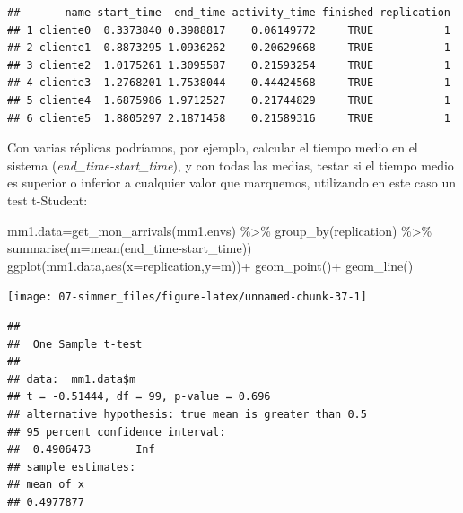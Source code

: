 \documentclass[
]{book}
\newenvironment{Shaded}{\begin{snugshade}}{\end{snugshade}}
\newcommand{\AttributeTok}[1]{\textcolor[rgb]{0.77,0.63,0.00}{#1}}
\newcommand{\FloatTok}[1]{\textcolor[rgb]{0.00,0.00,0.81}{#1}}
\newcommand{\FunctionTok}[1]{\textcolor[rgb]{0.00,0.00,0.00}{#1}}
\newcommand{\NormalTok}[1]{#1}
\newcommand{\OtherTok}[1]{\textcolor[rgb]{0.56,0.35,0.01}{#1}}
\newcommand{\SpecialCharTok}[1]{\textcolor[rgb]{0.00,0.00,0.00}{#1}}
\newcommand{\StringTok}[1]{\textcolor[rgb]{0.31,0.60,0.02}{#1}}
\theoremstyle{definition}
\theoremstyle{definition}
\theoremstyle{definition}
\theoremstyle{definition}
\theoremstyle{remark}
\begin{document}
\begin{verbatim}
##       name start_time  end_time activity_time finished replication
## 1 cliente0  0.3373840 0.3988817    0.06149772     TRUE           1
## 2 cliente1  0.8873295 1.0936262    0.20629668     TRUE           1
## 3 cliente2  1.0175261 1.3095587    0.21593254     TRUE           1
## 4 cliente3  1.2768201 1.7538044    0.44424568     TRUE           1
## 5 cliente4  1.6875986 1.9712527    0.21744829     TRUE           1
## 6 cliente5  1.8805297 2.1871458    0.21589316     TRUE           1
\end{verbatim}

Con varias réplicas podríamos, por ejemplo, calcular el tiempo medio en el sistema (\emph{end\_time-start\_time}), y con todas las medias, testar si el tiempo medio es superior o inferior a cualquier valor que marquemos, utilizando en este caso un test t-Student:

\begin{Shaded}
\begin{Highlighting}[]
\NormalTok{mm1.data}\OtherTok{=}\FunctionTok{get\_mon\_arrivals}\NormalTok{(mm1.envs) }\SpecialCharTok{\%\textgreater{}\%}
  \FunctionTok{group\_by}\NormalTok{(replication) }\SpecialCharTok{\%\textgreater{}\%}
  \FunctionTok{summarise}\NormalTok{(}\AttributeTok{m=}\FunctionTok{mean}\NormalTok{(end\_time}\SpecialCharTok{{-}}\NormalTok{start\_time))}
\FunctionTok{ggplot}\NormalTok{(mm1.data,}\FunctionTok{aes}\NormalTok{(}\AttributeTok{x=}\NormalTok{replication,}\AttributeTok{y=}\NormalTok{m))}\SpecialCharTok{+}
  \FunctionTok{geom\_point}\NormalTok{()}\SpecialCharTok{+}
  \FunctionTok{geom\_line}\NormalTok{()}
\end{Highlighting}
\end{Shaded}

\begin{center}\texttt{[image: 07-simmer\_files/figure-latex/unnamed-chunk-37-1]} \end{center}

\begin{Shaded}
\end{Shaded}

\begin{verbatim}
## 
##  One Sample t-test
## 
## data:  mm1.data$m
## t = -0.51444, df = 99, p-value = 0.696
## alternative hypothesis: true mean is greater than 0.5
## 95 percent confidence interval:
##  0.4906473       Inf
## sample estimates:
## mean of x 
## 0.4977877
\end{verbatim}
\end{document}
